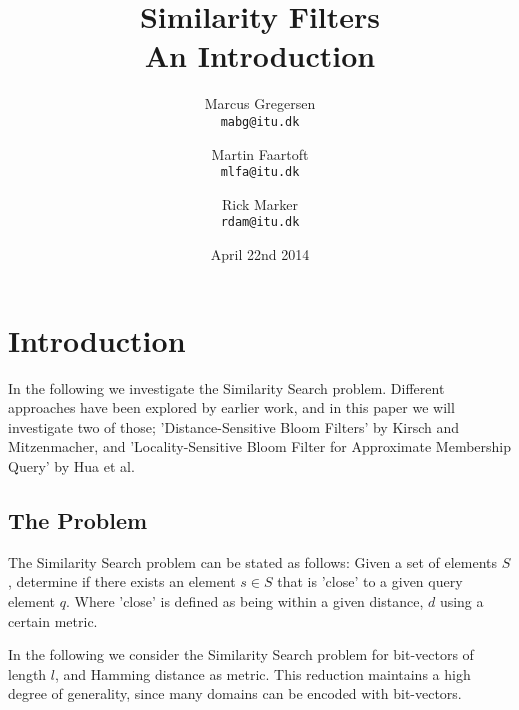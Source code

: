 \documentclass[a4paper,11pt]{article}
\begin{document}
\graphicspath{ {./images/} }
\date{April 22nd 2014}
\title{Similarity Filters\\An Introduction}

\author{Marcus Gregersen\\
\texttt{mabg@itu.dk}
\and Martin Faartoft\\
\texttt{mlfa@itu.dk}
\and Rick Marker\\
\texttt{rdam@itu.dk}}
\clearpage\maketitle
\thispagestyle{empty}
\setcounter{page}{1}

\section{Introduction}
In the following we investigate the Similarity Search problem. Different approaches have been explored by earlier work, and in this paper we will investigate two of those; 'Distance-Sensitive Bloom Filters'\cite{paper:harvard} by Kirsch and Mitzenmacher, and 'Locality-Sensitive Bloom Filter for Approximate Membership Query'\cite{paper:hua} by Hua et al.

\subsection{The Problem}
The Similarity Search problem can be stated as follows: Given a set of elements $S$, determine if there exists an element $s \in S$ that is 'close' to a given query element $q$. Where 'close' is defined as being within a given distance, $d$ using a certain metric.

In the following we consider the Similarity Search problem for bit-vectors of length $l$, and Hamming distance as metric. This reduction maintains a high degree of generality, since many domains can be encoded with bit-vectors.
\end{document}
